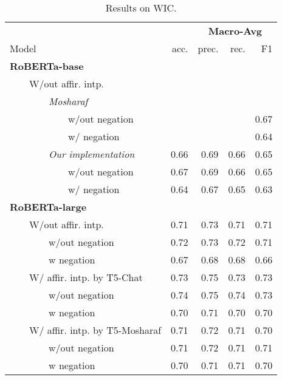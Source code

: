 

\begin{table*}
\centering
\begin{tabular}{lrrrr}
\toprule
&& \multicolumn{3}{c}{\textbf{Macro-Avg}} \\
Model & acc. & prec. & rec. & F1 \\
\midrule
\textbf{RoBERTa-base} \\
~~~~W/out affir. intp. \\
~~~~~~~~\textit{Mosharaf} \\
~~~~~~~~~~~~w/out negation &&&&0.67\\ 
~~~~~~~~~~~~w/ negation &&&&0.64\\ 
\midrule
~~~~~~~~\textit{Our implementation}  & 0.66 & 0.69 & 0.66 & 0.65\\
~~~~~~~~~~~~w/out negation & 0.67 & 0.69 & 0.66 & 0.65 \\
~~~~~~~~~~~~w/ negation  & 0.64 & 0.67 & 0.65 & 0.63\\ 
\bottomrule
\textbf{RoBERTa-large} \\
~~~~W/out affir. intp.  & 0.71 & 0.73 & 0.71 & 0.71 \\
~~~~~~~~w/out negation  & 0.72 & 0.73 & 0.72 & 0.71 \\ 
~~~~~~~~w negation  & 0.67 & 0.68 & 0.68 & 0.66 \\ 
\midrule
~~~~W/ affir. intp. by T5-Chat & 0.73 & 0.75 & 0.73 & 0.73 \\
~~~~~~~~w/out negation & 0.74 & 0.75 & 0.74 & 0.73 \\  
~~~~~~~~w negation & 0.70 & 0.71 & 0.70 & 0.70 \\ 
\midrule
~~~~W/ affir. intp. by T5-Mosharaf  & 0.71 & 0.72 & 0.71 & 0.70 \\ 
~~~~~~~~w/out negation  & 0.71 & 0.72 & 0.71 & 0.71 \\ 
~~~~~~~~w negation  & 0.70 & 0.71 & 0.71 & 0.70\\ 
\bottomrule
\end{tabular}
\caption{Results on WIC.}
\end{table*}